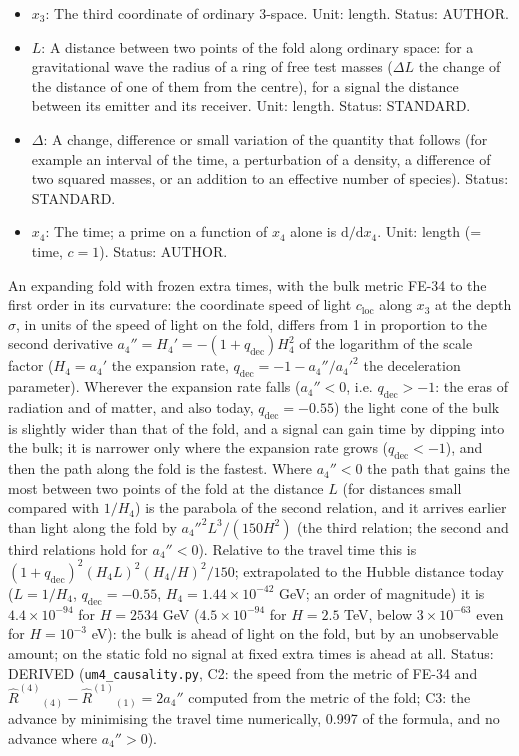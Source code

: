 \documentclass[
  10pt,
]{article}
\begin{document}
\begin{itemize}
  \(\mathrm{e}\): Euler's number, the base of the natural logarithm;
  \(\mathrm{e}^{X}\) is the exponential of \(X\). Unit: dimensionless.
  Value: 2.718281828. Status: STANDARD.
\item
  \(x_3\): The third coordinate of ordinary 3-space. Unit: length.
  Status: AUTHOR.
\item
  \(L\): A distance between two points of the fold along ordinary space:
  for a gravitational wave the radius of a ring of free test masses
  (\(\Delta L\) the change of the distance of one of them from the
  centre), for a signal the distance between its emitter and its
  receiver. Unit: length. Status: STANDARD.
\item
  \(\Delta\): A change, difference or small variation of the quantity
  that follows (for example an interval of the time, a perturbation of a
  density, a difference of two squared masses, or an addition to an
  effective number of species). Status: STANDARD.
\item
  \(x_4\): The time; a prime on a function of \(x_4\) alone is
  \(\mathrm{d}/\mathrm{d}x_4\). Unit: length (= time, \(c = 1\)).
  Status: AUTHOR.
\end{itemize}

An expanding fold with frozen extra times, with the bulk metric FE-34 to
the first order in its curvature: the coordinate speed of light
\(c_{\mathrm{loc}}\) along \(x_3\) at the depth \(\sigma\), in units of
the speed of light on the fold, differs from 1 in proportion to the
second derivative \(a_4'' = H_4' = -(1 + q_{\mathrm{dec}})H_4^2\) of the
logarithm of the scale factor (\(H_4 = a_4'\) the expansion rate,
\(q_{\mathrm{dec}} = -1 - a_4''/a_4'^2\) the deceleration parameter).
Wherever the expansion rate falls (\(a_4'' < 0\), i.e.
\(q_{\mathrm{dec}} > -1\): the eras of radiation and of matter, and also
today, \(q_{\mathrm{dec}} = -0.55\)) the light cone of the bulk is
slightly wider than that of the fold, and a signal can gain time by
dipping into the bulk; it is narrower only where the expansion rate
grows (\(q_{\mathrm{dec}} < -1\)), and then the path along the fold is
the fastest. Where \(a_4'' < 0\) the path that gains the most between
two points of the fold at the distance \(L\) (for distances small
compared with \(1/H_4\)) is the parabola of the second relation, and it
arrives earlier than light along the fold by \(a_4''^2L^3/(150H^2)\)
(the third relation; the second and third relations hold for
\(a_4'' < 0\)). Relative to the travel time this is
\((1 + q_{\mathrm{dec}})^2(H_4L)^2(H_4/H)^2/150\); extrapolated to the
Hubble distance today (\(L = 1/H_4\), \(q_{\mathrm{dec}} = -0.55\),
\(H_4 = 1.44\times10^{-42}\) GeV; an order of magnitude) it is
\(4.4\times10^{-94}\) for \(H = 2534\) GeV (\(4.5\times10^{-94}\) for
\(H = 2.5\) TeV, below \(3\times10^{-63}\) even for \(H = 10^{-3}\) eV):
the bulk is ahead of light on the fold, but by an unobservable amount;
on the static fold no signal at fixed extra times is ahead at all.
Status: DERIVED (\texttt{um4\_causality.py}, C2: the speed from the
metric of FE-34 and
\(\hat R^{(4)}{}_{(4)} - \hat R^{(1)}{}_{(1)} = 2a_4''\) computed from
the metric of the fold; C3: the advance by minimising the travel time
numerically, 0.997 of the formula, and no advance where \(a_4'' > 0\)).
\end{document}
